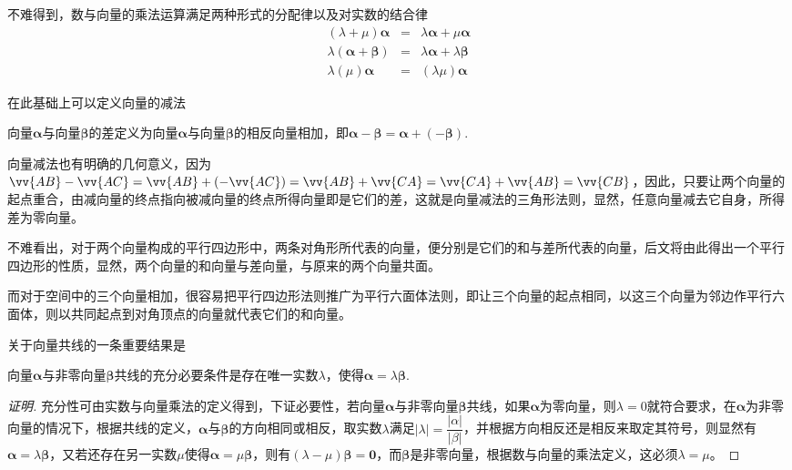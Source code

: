不难得到，数与向量的乘法运算满足两种形式的分配律以及对实数的结合律
\begin{eqnarray*}
  (\lambda + \mu) \bm{\alpha} & = & \lambda \bm{\alpha} + \mu \bm{\alpha} \\
  \lambda (\bm{\alpha} + \bm{\beta}) & = & \lambda \bm{\alpha} + \lambda \bm{\beta} \\
  \lambda (\mu) \bm{\alpha} & = & (\lambda \mu) \bm{\alpha}
\end{eqnarray*}

在此基础上可以定义向量的减法
\begin{definition}
  向量$\bm{\alpha}$与向量$\bm{\beta}$的差定义为向量$\bm{\alpha}$与向量$\bm{\beta}$的相反向量相加，即$\bm{\alpha}-\bm{\beta}=\bm{\alpha}+(-\bm{\beta})$.
\end{definition}

向量减法也有明确的几何意义，因为$\vv{AB}-\vv{AC}=\vv{AB}+(-\vv{AC})=\vv{AB}+\vv{CA}=\vv{CA}+\vv{AB}=\vv{CB}$，因此，只要让两个向量的起点重合，由减向量的终点指向被减向量的终点所得向量即是它们的差，这就是向量减法的三角形法则，显然，任意向量减去它自身，所得差为零向量。

不难看出，对于两个向量构成的平行四边形中，两条对角形所代表的向量，便分别是它们的和与差所代表的向量，后文将由此得出一个平行四边形的性质，显然，两个向量的和向量与差向量，与原来的两个向量共面。

而对于空间中的三个向量相加，很容易把平行四边形法则推广为平行六面体法则，即让三个向量的起点相同，以这三个向量为邻边作平行六面体，则以共同起点到对角顶点的向量就代表它们的和向量。

关于向量共线的一条重要结果是
\begin{theorem}[向量共线定理]
  \label{theorem:collinear-vector}
  向量$\bm{\alpha}$与非零向量$\bm{\beta}$共线的充分必要条件是存在唯一实数$\lambda$，使得$\bm{\alpha}=\lambda \bm{\beta}$.
\end{theorem}

\begin{proof}[证明]
 充分性可由实数与向量乘法的定义得到，下证必要性，若向量$\bm{\alpha}$与非零向量$\bm{\beta}$共线，如果$\bm{\alpha}$为零向量，则$\lambda=0$就符合要求，在$\bm{\alpha}$为非零向量的情况下，根据共线的定义，$\bm{\alpha}$与$\bm{\beta}$的方向相同或相反，取实数$\lambda$满足$|\lambda| = \dfrac{|\alpha|}{|\beta|}$，并根据方向相反还是相反来取定其符号，则显然有$\bm{\alpha} = \lambda \bm{\beta}$，又若还存在另一实数$\mu$使得$\bm{\alpha}=\mu \bm{\beta}$，则有$(\lambda - \mu)\bm{\beta}=\bm{0}$，而$\bm{\beta}$是非零向量，根据数与向量的乘法定义，这必须$\lambda=\mu$。
\end{proof}



